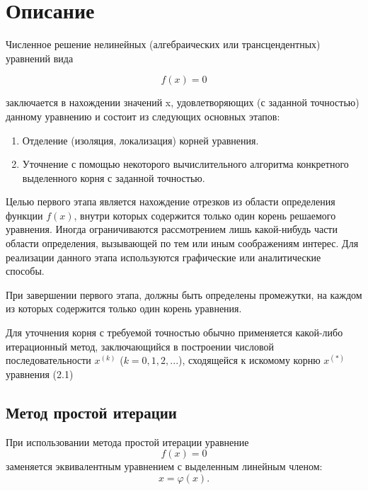 

\section*{Описание}

Численное решение нелинейных (алгебраических или трансцендентных) уравнений
вида 

\[
f(x) = 0 \tag{2.1}
\]

заключается в нахождении значений x, удовлетворяющих (с заданной точностью) данному
уравнению и состоит из следующих основных этапов:

\begin{enumerate}
    \item Отделение (изоляция, локализация) корней уравнения. \\
    \item Уточнение с помощью некоторого вычислительного алгоритма конкретного
выделенного корня с заданной точностью. \\
\end{enumerate}

Целью первого этапа является нахождение отрезков из области определения функции $f(x)$,
внутри которых содержится только один корень решаемого уравнения. Иногда
ограничиваются рассмотрением лишь какой-нибудь части области определения,
вызывающей по тем или иным соображениям интерес. Для реализации данного этапа
используются графические или аналитические способы. 

При завершении первого этапа, должны быть определены промежутки,
на каждом из которых содержится только один корень уравнения. 

Для уточнения корня с требуемой точностью обычно применяется какой-либо
итерационный метод, заключающийся в построении числовой последовательности
$x^{(k)}$ ($k = 0, 1, 2, ...$), сходящейся к искомому корню $x^{(*)}$ уравнения (2.1)

\subsection*{Метод простой итерации}
При использовании метода простой итерации уравнение 
\[ f(x) = 0 \tag{2.1} \]
заменяется эквивалентным уравнением с выделенным линейным членом:
\[ x = \varphi(x). \tag{2.5} \]

